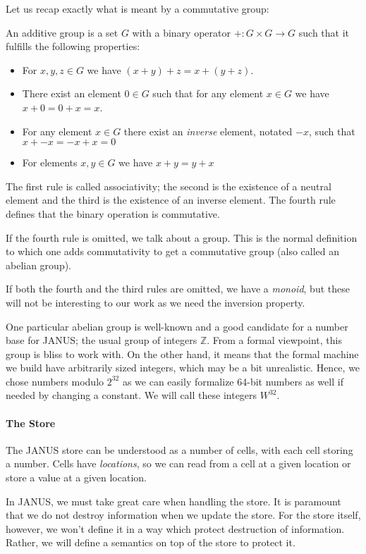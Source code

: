 Let us recap exactly what is meant by a commutative group:
\begin{defn}
  An additive group is a set $G$ with a binary operator $+\colon G
  \times G \to G$ such that it fulfills the following properties:
  \begin{itemize}
  \item For $x,y,z \in G$ we have $(x + y) + z = x + (y + z)$.
  \item There exist an element $0 \in G$ such that for any element $x
    \in G$ we have $x + 0 = 0 + x = x$.
  \item For any element $x \in G$ there exist an \emph{inverse}
    element, notated $-x$, such that $x + -x = -x + x = 0$
  \item For elements $x, y \in G$ we have $x + y = y + x$
  \end{itemize}
  The first rule is called associativity; the second is the existence
  of a neutral element and the third is the existence of an inverse
  element. The fourth rule defines that the binary operation is
  commutative.

  If the fourth rule is omitted, we talk about a group. This is the
  normal definition to which one adds commutativity to get a
  commutative group (also called an abelian group).

  If both the fourth and the third rules are omitted, we have a
  \emph{monoid}, but these will not be interesting to our work as we
  need the inversion property.
\end{defn}

One particular abelian group is well-known and a good candidate for a
number base for JANUS; the usual group of integers $\mathbb{Z}$. From
a formal viewpoint, this group is bliss to work with. On the other
hand, it means that the formal machine we build have arbitrarily sized
integers, which may be a bit unrealistic. Hence, we chose numbers
modulo $2^{32}$ as we can easily formalize 64-bit numbers as well if
needed by changing a constant. We will call these integers $W^{32}$.

\paragraph{The Store}

The JANUS store can be understood as a number of cells, with each cell
storing a number. Cells have \emph{locations}, so we can read from a
cell at a given location or store a value at a given location.

In JANUS, we must take great care when handling the store. It is
paramount that we do not destroy information when we update the
store. For the store itself, however, we won't define it in a way
which protect destruction of information. Rather, we will define a
semantics on top of the store to protect it.

